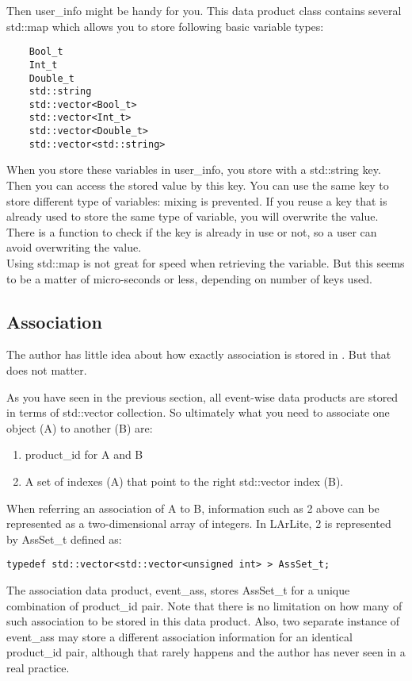 Then {\ttfamily user\_info} might be handy for you. This data product class contains several {\ttfamily std::map} which allows you to store following basic variable types:
\begin{lstlisting}
    Bool_t
    Int_t
    Double_t
    std::string
    std::vector<Bool_t>
    std::vector<Int_t>
    std::vector<Double_t>
    std::vector<std::string>
\end{lstlisting}
When you store these variables in {\ttfamily user\_info}, you store with a {\ttfamily std::string} key. 
Then you can access the stored value by this key. 
You can use the same key to store different type of variables: mixing is prevented.
If you reuse a key that is already used to store the same type of variable, you will overwrite the value.
There is a function to check if the key is already in use or not, so a user can avoid overwriting the value.\\

Using {\ttfamily std::map} is not great for speed when retrieving the variable. 
But this seems to be a matter of micro-seconds or less, depending on number of keys used.

\subsection{Association}
\label{chap:dataformat:association}
The author has little idea about how exactly association is stored in \ART. But that does not matter.

As you have seen in the previous section, all event-wise data products are stored in terms of {\ttfamily std::vector} collection.
So ultimately what you need to associate one object (A) to another (B) are:
\begin{enumerate}
\item {\ttfamily product\_id} for A and B
\item A set of indexes (A) that point to the right {\ttfamily std::vector} index (B).
\end{enumerate}
When referring an association of A to B, information such as 2 above can be represented as a two-dimensional array of integers.
In LArLite, 2 is represented by {\ttfamily AssSet\_t} defined as:
\begin{lstlisting}
typedef std::vector<std::vector<unsigned int> > AssSet_t;
\end{lstlisting}
The association data product, {\ttfamily event\_ass}, stores {\ttfamily AssSet\_t} for a unique combination
of {\ttfamily product\_id} pair. Note that there is no limitation on how many of such association to be stored in
this data product. Also, two separate instance of {\ttfamily event\_ass} may store a different association information
for an identical {\ttfamily product\_id} pair, although that rarely happens and the author has never seen in a real
practice.

